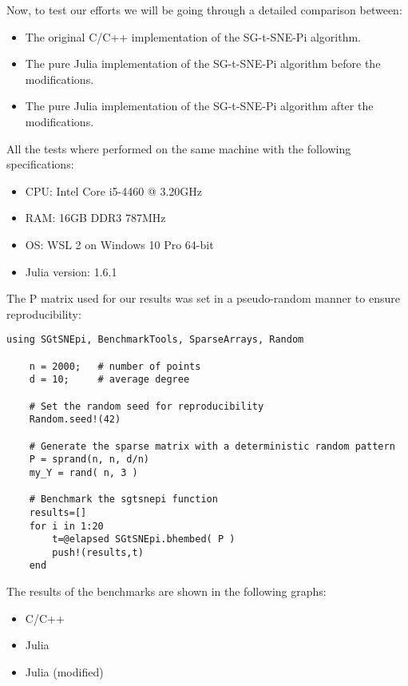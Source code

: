 Now, to test our efforts we will be going through a detailed comparison between:
\begin{itemize}
    \item The original C/C++ implementation of the SG-t-SNE-Pi algorithm.
    \item The pure Julia implementation of the SG-t-SNE-Pi algorithm before the modifications.
    \item The pure Julia implementation of the SG-t-SNE-Pi algorithm after the modifications.
\end{itemize}
All the tests where performed on the same machine with the following specifications:
\begin{itemize}
    \item CPU: Intel Core i5-4460 @ 3.20GHz
    \item RAM: 16GB DDR3 787MHz
    \item OS: WSL 2 on Windows 10 Pro 64-bit
    \item Julia version: 1.6.1
\end{itemize}
The P matrix used for our results was set in a pseudo-random manner to ensure reproducibility:
\begin{lstlisting}[style=julia]
    using SGtSNEpi, BenchmarkTools, SparseArrays, Random
    
    n = 2000;   # number of points
    d = 10;     # average degree
    
    # Set the random seed for reproducibility
    Random.seed!(42)
    
    # Generate the sparse matrix with a deterministic random pattern
    P = sprand(n, n, d/n)
    my_Y = rand( n, 3 )

    # Benchmark the sgtsnepi function
    results=[]
    for i in 1:20
        t=@elapsed SGtSNEpi.bhembed( P )
        push!(results,t)
    end
\end{lstlisting}
The results of the benchmarks are shown in the following graphs:
\begin{itemize}
    \item C/C++

    \item Julia 

    \item Julia (modified)

\end{itemize}
